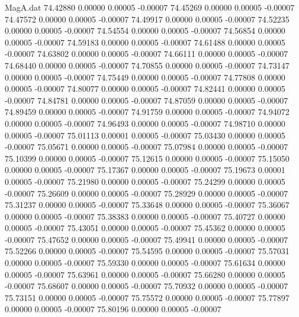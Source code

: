 \begin{filecontents}{MagA.dat}
  74.42880    0.00000    0.00005   -0.00007
  74.45269    0.00000    0.00005   -0.00007
  74.47572    0.00000    0.00005   -0.00007
  74.49917    0.00000    0.00005   -0.00007
  74.52235    0.00000    0.00005   -0.00007
  74.54554    0.00000    0.00005   -0.00007
  74.56854    0.00000    0.00005   -0.00007
  74.59183    0.00000    0.00005   -0.00007
  74.61488    0.00000    0.00005   -0.00007
  74.63802    0.00000    0.00005   -0.00007
  74.66111    0.00000    0.00005   -0.00007
  74.68440    0.00000    0.00005   -0.00007
  74.70855    0.00000    0.00005   -0.00007
  74.73147    0.00000    0.00005   -0.00007
  74.75449    0.00000    0.00005   -0.00007
  74.77808    0.00000    0.00005   -0.00007
  74.80077    0.00000    0.00005   -0.00007
  74.82441    0.00000    0.00005   -0.00007
  74.84781    0.00000    0.00005   -0.00007
  74.87059    0.00000    0.00005   -0.00007
  74.89459    0.00000    0.00005   -0.00007
  74.91759    0.00000    0.00005   -0.00007
  74.94072    0.00000    0.00005   -0.00007
  74.96493    0.00000    0.00005   -0.00007
  74.98710    0.00000    0.00005   -0.00007
  75.01113    0.00001    0.00005   -0.00007
  75.03430    0.00000    0.00005   -0.00007
  75.05671    0.00000    0.00005   -0.00007
  75.07984    0.00000    0.00005   -0.00007
  75.10399    0.00000    0.00005   -0.00007
  75.12615    0.00000    0.00005   -0.00007
  75.15050    0.00000    0.00005   -0.00007
  75.17367    0.00000    0.00005   -0.00007
  75.19673    0.00001    0.00005   -0.00007
  75.21980    0.00000    0.00005   -0.00007
  75.24299    0.00000    0.00005   -0.00007
  75.26609    0.00000    0.00005   -0.00007
  75.28929    0.00000    0.00005   -0.00007
  75.31237    0.00000    0.00005   -0.00007
  75.33648    0.00000    0.00005   -0.00007
  75.36067    0.00000    0.00005   -0.00007
  75.38383    0.00000    0.00005   -0.00007
  75.40727    0.00000    0.00005   -0.00007
  75.43051    0.00000    0.00005   -0.00007
  75.45362    0.00000    0.00005   -0.00007
  75.47652    0.00000    0.00005   -0.00007
  75.49941    0.00000    0.00005   -0.00007
  75.52266    0.00000    0.00005   -0.00007
  75.54595    0.00000    0.00005   -0.00007
  75.57031    0.00000    0.00005   -0.00007
  75.59330    0.00000    0.00005   -0.00007
  75.61634    0.00000    0.00005   -0.00007
  75.63961    0.00000    0.00005   -0.00007
  75.66280    0.00000    0.00005   -0.00007
  75.68607    0.00000    0.00005   -0.00007
  75.70932    0.00000    0.00005   -0.00007
  75.73151    0.00000    0.00005   -0.00007
  75.75572    0.00000    0.00005   -0.00007
  75.77897    0.00000    0.00005   -0.00007
  75.80196    0.00000    0.00005   -0.00007

\end{filecontents}

